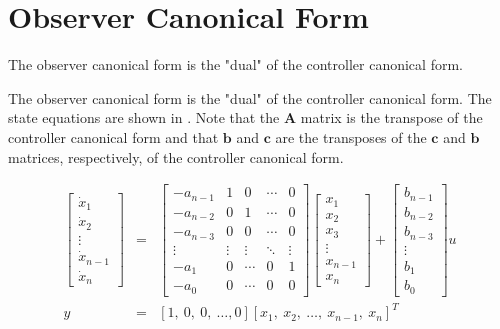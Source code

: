 \section*{Observer Canonical Form}
\ifslidesonly
\begin{slide}
The observer canonical form is the "dual" of the controller
canonical form.
\end{slide}
\fi
The observer canonical form is the "dual" of the controller
canonical form. The state equations are shown in
. Note that the $\mathbf{A}$ matrix is the
transpose of the controller canonical form and that $\mathbf{b}$
and $\mathbf{c}$ are the transposes of the $\mathbf{c}$ and
$\mathbf{b}$ matrices, respectively, of the controller canonical
form.
\begin{slide} \label{slide:l5s9} 
\begin{eqnarray*} \left[\begin{array}{c}
  \dot{x}_{1} \\
  \dot{x}_{2} \\
  \vdots \\
  \dot{x}_{n-1} \\
  \dot{x}_{n}
\end{array}\right] &=& \left[\begin{array}{ccccc}
 -a_{n-1} & 1 & 0 & \cdots & 0 \\
 -a_{n-2} & 0 & 1 & \cdots & 0 \\
 -a_{n-3} & 0 & 0 & \cdots & 0 \\
  \vdots & \vdots & \vdots & \ddots & \vdots \\
 -a_{1} & 0 & \cdots & 0 & 1 \\
 -a_{0} & 0 & \cdots & 0 & 0
\end{array}\right]\left[\begin{array}{c}
  {x}_{1} \\
  {x}_{2} \\
  {x}_{3} \\
  \vdots \\
  {x}_{n-1} \\
  {x}_{n}
\end{array}\right]+\left[\begin{array}{c}
  b_{n-1} \\
  b_{n-2} \\
  b_{n-3} \\
  \vdots \\
  b_{1} \\
  b_0
\end{array}\right]u\\ y & = & [1,\ 0,\ 0,\ \ldots, 0]\left[
  {x}_{1},\
  {x}_{2},\
  \ldots,\
  {x}_{n-1},\
  {x}_{n}
\right]^T
\end{eqnarray*}
\end{slide}
